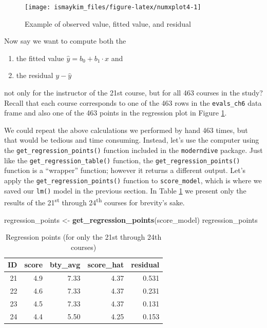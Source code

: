 \documentclass[12pt, krantz2,]{krantz}
\makeatletter
\newenvironment{Shaded}{\begin{snugshade}}{\end{snugshade}}
\newcommand{\KeywordTok}[1]{\textcolor[rgb]{0.27,0.27,0.27}{\textbf{#1}}}
\newcommand{\NormalTok}[1]{#1}
\newcommand{\StringTok}[1]{\textcolor[rgb]{0.5,0.5,0.5}{#1}}
\providecommand{\tightlist}{%
  \setlength{\itemsep}{0pt}\setlength{\parskip}{0pt}}
\newenvironment{kframe}{%
\medskip{}
\setlength{\fboxsep}{.8em}
 \def\at@end@of@kframe{}%
 \ifinner\ifhmode%
  \def\at@end@of@kframe{\end{minipage}}%
  \begin{minipage}{\columnwidth}%
 \fi\fi%
 \def\FrameCommand##1{\hskip\@totalleftmargin \hskip-\fboxsep
 \colorbox{shadecolor}{##1}\hskip-\fboxsep
     \hskip-\linewidth \hskip-\@totalleftmargin \hskip\columnwidth}%
 \MakeFramed {\advance\hsize-\width
   \@totalleftmargin\z@ \linewidth\hsize
   \@setminipage}}%
 {\par\unskip\endMakeFramed%
 \at@end@of@kframe}
\renewenvironment{Shaded}{\begin{kframe}}{\end{kframe}}
\makeatother
\begin{document}
\begin{figure}

{\centering \texttt{[image: ismaykim\_files/figure-latex/numxplot4-1]} 

}

\caption{Example of observed value, fitted value, and residual}\label{fig:numxplot4}
\end{figure}

Now say we want to compute both the

\begin{enumerate}
\def\labelenumi{\arabic{enumi}.}
\tightlist
\item
  the fitted value \(\widehat{y} = b_0 + b_1 \cdot x\) and
\item
  the residual \(y - \widehat{y}\)
\end{enumerate}

not only for the instructor of the 21st course, but for all 463 courses in the study? Recall that each course corresponds to one of the 463 rows in the \texttt{evals\_ch6} data frame and also one of the 463 points in the regression plot in Figure \ref{fig:numxplot4}.

We could repeat the above calculations we performed by hand 463 times, but that would be tedious and time consuming. Instead, let's use the computer using the \texttt{get\_regression\_points()} function included in the \texttt{moderndive} package. Just like the \texttt{get\_regression\_table()} function, the \texttt{get\_regression\_points()} function is a ``wrapper'' function; however it returns a different output. Let's apply the \texttt{get\_regression\_points()} function to \texttt{score\_model}, which is where we saved our \texttt{lm()} model in the previous section. In Table \ref{tab:regression-points-1} we present only the results of the 21\textsuperscript{st} through 24\textsuperscript{th} courses for brevity's sake.

\begin{Shaded}
\begin{Highlighting}[]
\NormalTok{regression_points <-}\StringTok{ }\KeywordTok{get_regression_points}\NormalTok{(score_model)}
\NormalTok{regression_points}
\end{Highlighting}
\end{Shaded}

\begin{table}[t]

\caption{\label{tab:regression-points-1}Regression points (for only the 21st through 24th courses)}
\centering
\begin{tabular}{rrrrr}
\toprule
ID & score & bty\_avg & score\_hat & residual\\
\midrule
21 & 4.9 & 7.33 & 4.37 & 0.531\\
22 & 4.6 & 7.33 & 4.37 & 0.231\\
23 & 4.5 & 7.33 & 4.37 & 0.131\\
24 & 4.4 & 5.50 & 4.25 & 0.153\\
\bottomrule
\end{tabular}
\end{table}
\end{document}
